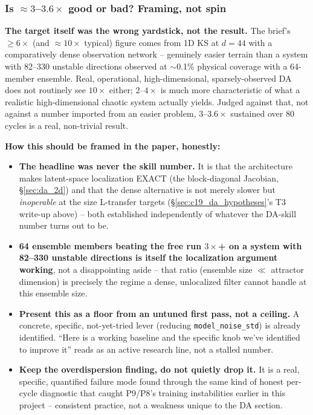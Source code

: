 \documentclass[11pt]{article}
\begin{document}
\subsubsection*{Is $\approx3$--$3.6\times$ good or bad? Framing, not spin}
\textbf{The target itself was the wrong yardstick, not the result.} The
brief's $\ge6\times$ (and $\approx10\times$ typical) figure comes from
1D KS at $d{=}44$ with a comparatively dense observation network --
genuinely easier terrain than a system with 82--330 unstable directions
observed at $\sim$0.1\% physical coverage with a 64-member ensemble.
Real, operational, high-dimensional, sparsely-observed DA does not
routinely see $10\times$ either; $2$--$4\times$ is much more
characteristic of what a realistic high-dimensional chaotic system
actually yields. Judged against that, not against a number imported from
an easier problem, $3$--$3.6\times$ sustained over 80 cycles is a real,
non-trivial result.

\textbf{How this should be framed in the paper, honestly:}
\begin{itemize}[leftmargin=*]
\item \textbf{The headline was never the skill number.} It is that the
  architecture makes latent-space localization EXACT (the block-diagonal
  Jacobian, \S\ref{sec:da_2d}) and that the dense alternative is not
  merely slower but \emph{inoperable} at the size L-transfer targets
  (\S\ref{sec:c19_da_hypotheses}'s T3 write-up above) -- both established
  independently of whatever the DA-skill number turns out to be.
\item \textbf{64 ensemble members beating the free run $3\times$+ on a
  system with 82--330 unstable directions is itself the localization
  argument working}, not a disappointing aside -- that ratio
  (ensemble size $\ll$ attractor dimension) is precisely the regime a
  dense, unlocalized filter cannot handle at this ensemble size.
\item \textbf{Present this as a floor from an untuned first pass, not a
  ceiling.} A concrete, specific, not-yet-tried lever (reducing
  \texttt{model\_noise\_std}) is already identified. ``Here is a working
  baseline and the specific knob we've identified to improve it''
  reads as an active research line, not a stalled number.
\item \textbf{Keep the overdispersion finding, do not quietly drop it.}
  It is a real, specific, quantified failure mode found through the
  same kind of honest per-cycle diagnostic that caught P9/P8's training
  instabilities earlier in this project -- consistent practice, not a
  weakness unique to the DA section.
\end{itemize}
\end{document}
